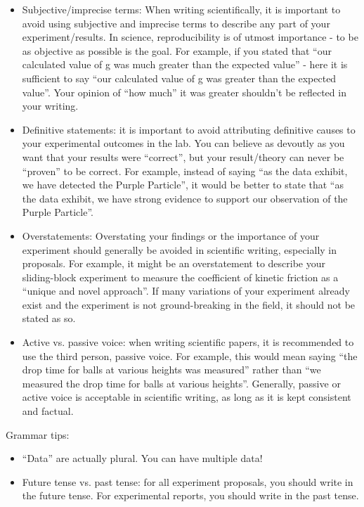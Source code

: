 \begin{itemize}
\item Subjective/imprecise terms: When writing scientifically, it is important to avoid using subjective and imprecise terms to describe any part of your experiment/results. In science, reproducibility is of utmost importance - to be as objective as possible is the goal. For example, if you stated that ``our calculated value of g was much greater than the expected value'' - here it is sufficient to say ``our calculated value of g was greater than the expected value''. Your opinion of ``how much'' it was greater shouldn't be reflected in your writing.
\item Definitive statements: it is important to avoid attributing definitive causes to your experimental outcomes in the lab. You can believe as devoutly as you want that your results were ``correct'', but your result/theory can never be ``proven'' to be correct. For example, instead of saying ``as the data exhibit, we have detected the Purple Particle'', it would be better to state that ``as the data exhibit, we have strong evidence to support our observation of the Purple Particle''. 
\item Overstatements: Overstating your findings or the importance of your experiment should generally be avoided in scientific writing, especially in proposals. For example, it might be an overstatement to describe your sliding-block experiment to measure the coefficient of kinetic friction as a ``unique and novel approach''. If many variations of your experiment already exist and the experiment is not ground-breaking in the field, it should not be stated as so.
\item Active vs. passive voice: when writing scientific papers, it is recommended to use the third person, passive voice. For example, this would mean saying ``the drop time for balls at various heights was measured'' rather than ``we measured the drop time for balls at various heights''. Generally, passive or active voice is acceptable in scientific writing, as long as it is kept consistent and factual.
\end{itemize}

Grammar tips: %
\begin{itemize}
\item ``Data'' are actually plural. You can have multiple data!
\item Future tense vs. past tense: for all experiment proposals, you should write in the future tense. For experimental reports, you should write in the past tense. 
\end{itemize}

